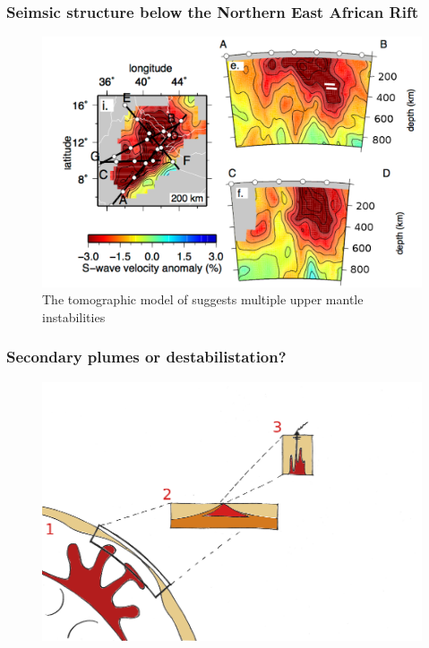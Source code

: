 \documentclass[aspectratio=169]{beamer}
\begin{document}
\begin{frame}
    \frametitle{Seimsic structure below the Northern East African Rift}
    \begin{figure}
        \vspace{-0.3cm}
        \includegraphics[height=0.7\paperheight]{./figures/chiara1.png}
        \caption{The tomographic model of \cite{civiero-etal-2016} suggests multiple upper mantle instabilities}
    \end{figure}
\end{frame}

\begin{frame}
    \frametitle{Secondary plumes or destabilistation?}
    \begin{figure}
        \includegraphics[height=0.9\paperheight]{./pictures/drawing.png}
    \end{figure}
\end{frame}
\end{document}
